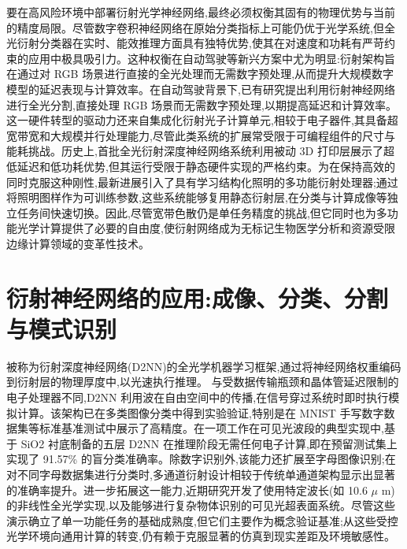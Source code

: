 要在高风险环境中部署衍射光学神经网络,最终必须权衡其固有的物理优势与当前的精度局限。尽管数字卷积神经网络在原始分类指标上可能仍优于光学系统,但全光衍射分类器在实时、能效推理方面具有独特优势,使其在对速度和功耗有严苛约束的应用中极具吸引力。这种权衡在自动驾驶等新兴方案中尤为明显:衍射架构旨在通过对 RGB 场景进行直接的全光处理而无需数字预处理,从而提升大规模数字模型的延迟表现与计算效率。在自动驾驶背景下,已有研究提出利用衍射神经网络进行全光分割,直接处理 RGB 场景而无需数字预处理,以期提高延迟和计算效率。\citep{doi_10_48550_arxiv_2602_07717_16cb1c7a} 这一硬件转型的驱动力还来自集成化衍射光子计算单元,相较于电子器件,其具备超宽带宽和大规模并行处理能力,尽管此类系统的扩展常受限于可编程组件的尺寸与能耗挑战。历史上,首批全光衍射深度神经网络系统利用被动 3D 打印层展示了超低延迟和低功耗优势,但其运行受限于静态硬件实现的严格约束。为在保持高效的同时克服这种刚性,最新进展引入了具有学习结构化照明的多功能衍射处理器;通过将照明图样作为可训练参数,这些系统能够复用静态衍射层,在分类与计算成像等独立任务间快速切换。因此,尽管宽带色散仍是单任务精度的挑战,但它同时也为多功能光学计算提供了必要的自由度,使衍射网络成为无标记生物医学分析和资源受限边缘计算领域的变革性技术。\citep{doi_10_1364_ol_593231_ab93febc} \citep{doi_10_48550_arxiv_2602_07717_16cb1c7a} \citep{doi_10_1038_s41467_022_28702_0_1b79b43c} \citep{doi_10_1364_josab_497148_b087424b} \citep{doi_10_1364_ol_591818_8738c4b1}

\section{衍射神经网络的应用:成像、分类、分割与模式识别}\label{ux884dux5c04ux795eux7ecfux7f51ux7edcux7684ux5e94ux7528ux6210ux50cfux5206ux7c7bux5206ux5272ux4e0eux6a21ux5f0fux8bc6ux522b}

被称为衍射深度神经网络(D2NN)的全光学机器学习框架,通过将神经网络权重编码到衍射层的物理厚度中,以光速执行推理。\citep{doi_10_1021_acsphotonics_4c01284_s001_10346917} 与受数据传输瓶颈和晶体管延迟限制的电子处理器不同,D2NN 利用波在自由空间中的传播,在信号穿过系统时即时执行模拟计算。该架构已在多类图像分类中得到实验验证,特别是在 MNIST 手写数字数据集等标准基准测试中展示了高精度。在一项工作在可见光波段的典型实现中,基于 SiO2 衬底制备的五层 D2NN 在推理阶段无需任何电子计算,即在预留测试集上实现了 91.57\% 的盲分类准确率。除数字识别外,该能力还扩展至字母图像识别;在对不同字母数据集进行分类时,多通道衍射设计相较于传统单通道架构显示出显著的准确率提升。进一步拓展这一能力,近期研究开发了使用特定波长(如 10.6 \(\mu\) m)的非线性全光学实现,以及能够进行复杂物体识别的可见光超表面系统。尽管这些演示确立了单一功能任务的基础成熟度,但它们主要作为概念验证基准;从这些受控光学环境向通用计算的转变,仍有赖于克服显著的仿真到现实差距及环境敏感性。\citep{doi_10_54097_hset_v24i_3957_e6f20e8a} \citep{doi_10_1016_j_eng_2020_07_032_6e23cd05} \citep{doi_10_1155_2021_6667495_60f04b14} \citep{doi_10_1109_piers53385_2021_9694760_15b5fd61}

